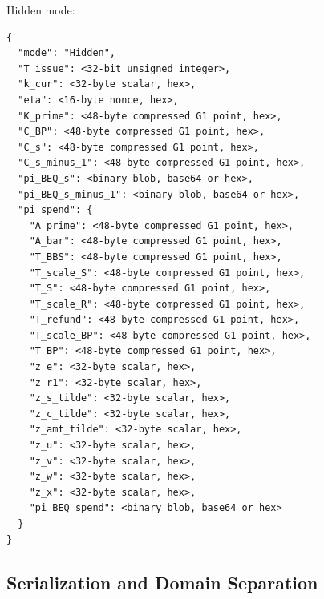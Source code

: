 \documentclass[11pt]{article}
\theoremstyle{definitionstyle}
\theoremstyle{plain}
\begin{document}
Hidden mode:
\begin{verbatim}
{
  "mode": "Hidden",
  "T_issue": <32-bit unsigned integer>,
  "k_cur": <32-byte scalar, hex>,
  "eta": <16-byte nonce, hex>,
  "K_prime": <48-byte compressed G1 point, hex>,
  "C_BP": <48-byte compressed G1 point, hex>,
  "C_s": <48-byte compressed G1 point, hex>,
  "C_s_minus_1": <48-byte compressed G1 point, hex>,
  "pi_BEQ_s": <binary blob, base64 or hex>,
  "pi_BEQ_s_minus_1": <binary blob, base64 or hex>,
  "pi_spend": {
    "A_prime": <48-byte compressed G1 point, hex>,
    "A_bar": <48-byte compressed G1 point, hex>,
    "T_BBS": <48-byte compressed G1 point, hex>,
    "T_scale_S": <48-byte compressed G1 point, hex>,
    "T_S": <48-byte compressed G1 point, hex>,
    "T_scale_R": <48-byte compressed G1 point, hex>,
    "T_refund": <48-byte compressed G1 point, hex>,
    "T_scale_BP": <48-byte compressed G1 point, hex>,
    "T_BP": <48-byte compressed G1 point, hex>,
    "z_e": <32-byte scalar, hex>,
    "z_r1": <32-byte scalar, hex>,
    "z_s_tilde": <32-byte scalar, hex>,
    "z_c_tilde": <32-byte scalar, hex>,
    "z_amt_tilde": <32-byte scalar, hex>,
    "z_u": <32-byte scalar, hex>,
    "z_v": <32-byte scalar, hex>,
    "z_w": <32-byte scalar, hex>,
    "z_x": <32-byte scalar, hex>,
    "pi_BEQ_spend": <binary blob, base64 or hex>
  }
}
\end{verbatim}

\subsection{Serialization and Domain Separation}
\end{document}
